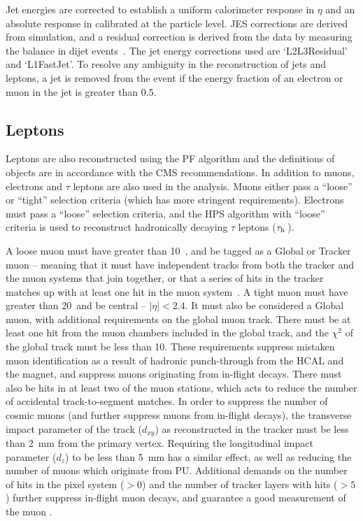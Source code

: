Jet energies are corrected to establish a uniform calorimeter 
response in $\eta$ and an absolute response in \pt calibrated at 
the particle level.  
\ac{JES} corrections are derived from simulation, and a residual correction is derived 
from the data by measuring the \pt balance in dijet events~\cite{bib:ANA_JME-10-010}.
The jet energy corrections used are `L2L3Residual' and `L1FastJet'.
To resolve any ambiguity in the reconstruction of jets and leptons, a jet is removed from the event if the energy fraction of an electron or muon in the jet is greater than 0.5.



\subsection{Leptons}

Leptons are also reconstructed using the \ac{PF} algorithm and the definitions of objects are in accordance with the \ac{CMS} recommendations.
In addition to muons, electrons and $\tau$ leptons are also used in the analysis.
Muons either pass a ``loose'' or ``tight'' selection criteria (which has more stringent requirements). 
Electrons must pass a ``loose'' selection criteria, and the \ac{HPS} algorithm with ``loose'' criteria is used to reconstruct hadronically decaying $\tau$ leptons ($\tau_\mathrm{h}\,$).

A loose muon must have \pt greater than 10~\GeV, and be tagged as a Global or Tracker muon -- meaning that it must
have independent tracks from both the tracker and the muon systems that join together, or that a series of hits in the tracker matches up with at least one hit in the muon system~\cite{CMS-PAPER-MUO-10-004}. 
%
A tight muon must have \pt greater than 20~\GeV and be central -- $|\eta|<2.4$. 
It must also be considered a Global muon, with additional requirements on the global muon track. 
There must be at least one hit from the muon chambers included in the global track, and the $\chi^{2}$ of the global track must be less than 10. These requirements suppress mistaken muon identification as a result of hadronic punch-through from the \ac{HCAL} and the magnet, and suppress muons originating from in-flight decays.
There must also be hits in at least two of the muon stations, which acts to reduce the number of accidental track-to-segment matches.
In order to suppress the number of cosmic muons (and further suppress muons from in-flight decays), the transverse impact parameter of the track ($d_{xy}$) as reconstructed in the tracker must be less than 2~mm from the primary vertex. 
Requiring the longitudinal impact parameter ($d_{z}$) to be less than 5~mm has a similar effect, as well as reducing the number of muons which originate from \ac{PU}.
Additional demands on the number of hits in the pixel system ($>0$) and the number of tracker layers with hits ($>5$) further suppress in-flight muon decays, and guarantee a good measurement of the muon \pt.

